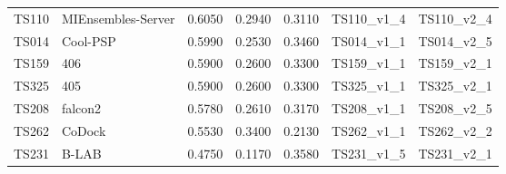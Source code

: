 \begin{table}[ht]
{\begin{tabular}{llrrrll}
TS110 & MIEnsembles-Server & 0.6050 & 0.2940 & 0.3110 & TS110\_v1\_4 & TS110\_v2\_4 \\ 
TS014 & Cool-PSP & 0.5990 & 0.2530 & 0.3460 & TS014\_v1\_1 & TS014\_v2\_5 \\ 
TS159 & 406 & 0.5900 & 0.2600 & 0.3300 & TS159\_v1\_1 & TS159\_v2\_1 \\ 
TS325 & 405 & 0.5900 & 0.2600 & 0.3300 & TS325\_v1\_1 & TS325\_v2\_1 \\ 
TS208 & falcon2 & 0.5780 & 0.2610 & 0.3170 & TS208\_v1\_1 & TS208\_v2\_5 \\ 
TS262 & CoDock & 0.5530 & 0.3400 & 0.2130 & TS262\_v1\_1 & TS262\_v2\_2 \\ 
TS231 & B-LAB & 0.4750 & 0.1170 & 0.3580 & TS231\_v1\_5 & TS231\_v2\_1 \\ 
\bottomrule
\end{tabular}%
}
\end{table}
